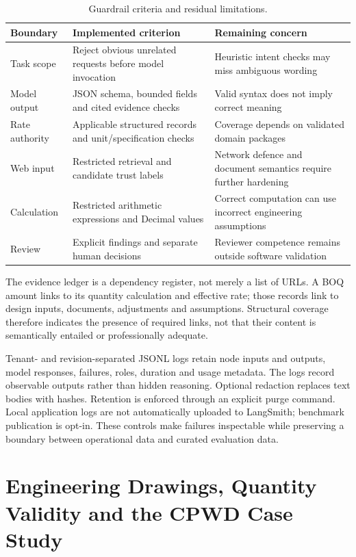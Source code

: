 \documentclass[11pt,a4paper]{article}
\begin{document}
\begin{table}[H]\caption{Guardrail criteria and residual limitations.}\small
\begin{tabularx}{\linewidth}{p{.22\linewidth}XX}\toprule
Boundary & Implemented criterion & Remaining concern \\\midrule
Task scope & Reject obvious unrelated requests before model invocation & Heuristic intent checks may miss ambiguous wording \\
Model output & JSON schema, bounded fields and cited evidence checks & Valid syntax does not imply correct meaning \\
Rate authority & Applicable structured records and unit/specification checks & Coverage depends on validated domain packages \\
Web input & Restricted retrieval and candidate trust labels & Network defence and document semantics require further hardening \\
Calculation & Restricted arithmetic expressions and Decimal values & Correct computation can use incorrect engineering assumptions \\
Review & Explicit findings and separate human decisions & Reviewer competence remains outside software validation \\\bottomrule
\end{tabularx}\end{table}

The evidence ledger is a dependency register, not merely a list of URLs. A BOQ amount links to its quantity calculation and effective rate; those records link to design inputs, documents, adjustments and assumptions. Structural coverage therefore indicates the presence of required links, not that their content is semantically entailed or professionally adequate.

Tenant- and revision-separated JSONL logs retain node inputs and outputs, model responses, failures, roles, duration and usage metadata. The logs record observable outputs rather than hidden reasoning. Optional redaction replaces text bodies with hashes. Retention is enforced through an explicit purge command. Local application logs are not automatically uploaded to LangSmith; benchmark publication is opt-in. These controls make failures inspectable while preserving a boundary between operational data and curated evaluation data.

\section{Engineering Drawings, Quantity Validity and the CPWD Case Study}
\end{document}
